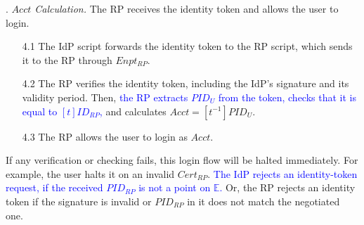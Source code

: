 . {\em $Acct$ Calculation.}
The RP receives the identity token and allows the user to login.
\vspace{-\topsep}
\begin{itemize}
\setlength{\topsep}{0pt}
\setlength{\partopsep}{0pt}
\setlength{\itemsep}{0pt}
\setlength{\parsep}{0pt}
\setlength{\parskip}{0pt}
\item [4.1]
The IdP script forwards the identity token to the RP script,
    which sends it to the RP through $Enpt_{RP}$.
\item[4.2] The RP verifies the identity token, including the IdP's signature and its validity period.
Then, \textcolor{blue}{the RP extracts $PID_U$ from the token, checks that it is equal to $[t]ID_{RP}$,}
and calculates $Acct = [t^{-1}]{PID_U}$.

\item [4.3] The RP allows the user to login as $Acct$.

\end{itemize}


If any verification or checking fails,
     this login flow will be halted immediately.
For example, the user halts it
    on an invalid $Cert_{RP}$.
\textcolor{blue}{The IdP rejects an identity-token request, if the received $PID_{RP}$ is not a point on $\mathbb{E}$.}
Or, the RP rejects an identity token
    if the signature is invalid or $PID_{RP}$ in it does not match the negotiated one.



